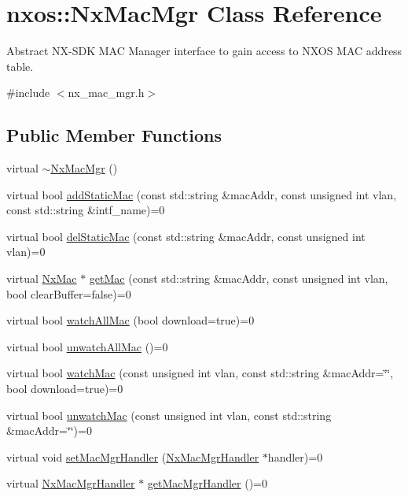 \hypertarget{classnxos_1_1_nx_mac_mgr}{}\section{nxos\+:\+:Nx\+Mac\+Mgr Class Reference}
\label{classnxos_1_1_nx_mac_mgr}


Abstract N\+X-\/\+S\+DK M\+AC Manager interface to gain access to N\+X\+OS M\+AC address table.  




{\ttfamily \#include $<$nx\+\_\+mac\+\_\+mgr.\+h$>$}

\subsection*{Public Member Functions}
\begin{DoxyCompactItemize}
\item 
virtual \mbox{\hyperlink{classnxos_1_1_nx_mac_mgr_a850cc17a798501d3e5e1aea213bb2a41}{$\sim$\+Nx\+Mac\+Mgr}} ()
\item 
virtual bool \mbox{\hyperlink{classnxos_1_1_nx_mac_mgr_a688eeadbbf960420b24eb13883f77008}{add\+Static\+Mac}} (const std\+::string \&mac\+Addr, const unsigned int vlan, const std\+::string \&intf\+\_\+name)=0
\item 
virtual bool \mbox{\hyperlink{classnxos_1_1_nx_mac_mgr_aa8853103d4b94e6153f2b0cc5f130b77}{del\+Static\+Mac}} (const std\+::string \&mac\+Addr, const unsigned int vlan)=0
\item 
virtual \mbox{\hyperlink{classnxos_1_1_nx_mac}{Nx\+Mac}} $\ast$ \mbox{\hyperlink{classnxos_1_1_nx_mac_mgr_ab205e4819bfc3eca4396a194400d9b12}{get\+Mac}} (const std\+::string \&mac\+Addr, const unsigned int vlan, bool clear\+Buffer=false)=0
\item 
virtual bool \mbox{\hyperlink{classnxos_1_1_nx_mac_mgr_a5f4d2d56e21e3ae39969fa67774779d8}{watch\+All\+Mac}} (bool download=true)=0
\item 
virtual bool \mbox{\hyperlink{classnxos_1_1_nx_mac_mgr_aac2eae84327fa4a94616d214ac779fac}{unwatch\+All\+Mac}} ()=0
\item 
virtual bool \mbox{\hyperlink{classnxos_1_1_nx_mac_mgr_a12dde38c22d9a27e1e3bde318d418134}{watch\+Mac}} (const unsigned int vlan, const std\+::string \&mac\+Addr=\char`\"{}\char`\"{}, bool download=true)=0
\item 
virtual bool \mbox{\hyperlink{classnxos_1_1_nx_mac_mgr_af3a7878b8b604baa1e388c9b9ea9c952}{unwatch\+Mac}} (const unsigned int vlan, const std\+::string \&mac\+Addr=\char`\"{}\char`\"{})=0
\item 
virtual void \mbox{\hyperlink{classnxos_1_1_nx_mac_mgr_a06f53bd41ddb17e6cfaef5a02b00415d}{set\+Mac\+Mgr\+Handler}} (\mbox{\hyperlink{classnxos_1_1_nx_mac_mgr_handler}{Nx\+Mac\+Mgr\+Handler}} $\ast$handler)=0
\item 
virtual \mbox{\hyperlink{classnxos_1_1_nx_mac_mgr_handler}{Nx\+Mac\+Mgr\+Handler}} $\ast$ \mbox{\hyperlink{classnxos_1_1_nx_mac_mgr_a94e3fcb535f109501d319d72a24bdead}{get\+Mac\+Mgr\+Handler}} ()=0
\end{DoxyCompactItemize}


